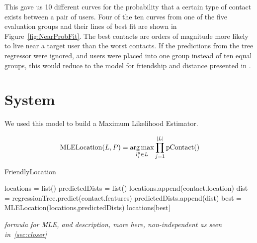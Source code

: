 This gave us 10 different curves for the probability that a certain type of
contact exists between a pair of users.
%
Four of the ten curves from one of the five evaluation groups and their lines
of best fit are shown in Figure~\ref{fig:NearProbFit}.
%
The best contacts are orders of magnitude more
likely to live near a target user than the worst contacts.
%
If the predictions from the tree regressor were ignored, and users were placed
into one group instead of ten equal groups, this would reduce to the model
for friendship and distance presented in \cite{backstrom2010find}.


\section{System}
We used this model to build a Maximum Likelihood Estimator.

\[
    \operatorname{MLELocation}(L,P) = \operatorname*{arg\,max}_{l^g_i \in L}
    \prod_{j=1}^{|L|} \operatorname{pContact}()
\]

\begin{algorithm}
  \caption{FriendlyLocation \label{alg:friendloc}}
  \begin{algorithmic}[0]
  \State locations = list()
  \State predictedDists = list()
        \State \Continue
      \EndIf
      \State locations.append(contact.location)
      \State dist = regressionTree.predict(contact.features)
      \State predictedDists.append(dist)
  \EndFor
  \State best = MLELocation(locations,predictedDists)
  \State \Return locations[best]
  \end{algorithmic}
\end{algorithm}

\emph{formula for MLE, and description,
more here,
non-independent as seen in~\ref{sec:closer}
}


